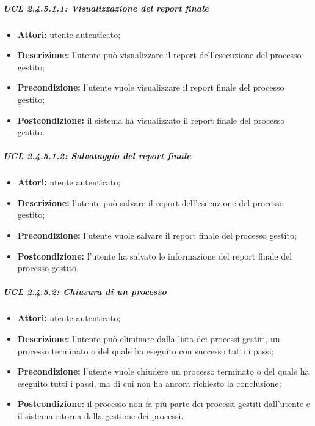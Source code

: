 \subparagraph{UCL 2.4.5.1.1: Visualizzazione del report finale}
\begin{itemize}
\item \textbf{Attori:} utente autenticato;
\item \textbf{Descrizione:} l'utente può visualizzare il report dell'esecuzione del processo gestito;
\item \textbf{Precondizione:} l'utente vuole visualizzare il report finale del processo gestito;
\item \textbf{Postcondizione:} il sistema ha visualizzato il report finale del processo gestito.
\end{itemize}

\subparagraph{UCL 2.4.5.1.2: Salvataggio del report finale}
\begin{itemize}
\item \textbf{Attori:} utente autenticato;
\item \textbf{Descrizione:} l'utente può salvare il report dell'esecuzione del processo gestito;
\item \textbf{Precondizione:} l'utente vuole salvare il report finale del processo gestito;
\item \textbf{Postcondizione:} l'utente ha salvato le informazione del report finale del processo gestito.
\end{itemize}

\subparagraph{UCL 2.4.5.2: Chiusura di un processo}
\begin{itemize}
\item \textbf{Attori:} utente autenticato;
\item \textbf{Descrizione:} l'utente può eliminare dalla lista dei processi gestiti, un processo terminato o del quale ha eseguito con successo tutti i passi;
\item \textbf{Precondizione:} l'utente vuole chiudere un processo terminato o del quale ha eseguito tutti i passi, ma di cui non ha ancora richiesto la conclusione;
\item \textbf{Postcondizione:} il processo non fa più parte dei processi gestiti dall'utente e il sistema ritorna dalla gestione dei processi.
\end{itemize}

